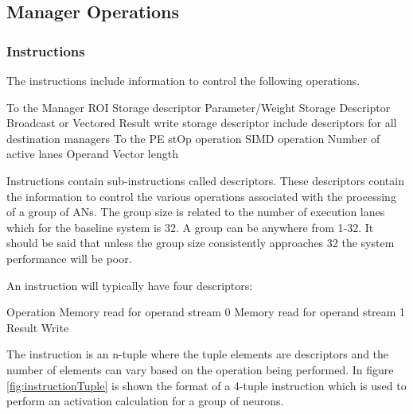 \documentclass[journal]{IEEEtran}
\begin{document}
\subsection{Manager Operations}
\label{sec:Manager Operations}

\subsubsection{Instructions}
\label{ssec:Instructions}
The instructions include information to control the following operations.

\begin{outline}
        \1 To the Manager
            \2 ROI Storage descriptor
            \2 Parameter/Weight Storage Descriptor
                \3 Broadcast or Vectored
            \2 Result write storage descriptor
                \3 include descriptors for all destination managers
        \1 To the PE
            \2 stOp operation
            \2 SIMD operation
            \2 Number of active lanes
            \2 Operand Vector length
\end{outline}


Instructions contain sub-instructions called descriptors. 
These descriptors contain the information to control the various operations associated with the processing of a group of ANs.
The group size is related to the number of execution lanes which for the baseline system is 32. A group can be anywhere from 1-32. It should be said that unless the group size consistently approaches 32 the system performance will be poor.

An instruction will typically have four descriptors:

\begin{outline}
\renewcommand{\outlinei}{enumerate}
    \1 Operation
    \1 Memory read for operand stream 0
    \1 Memory read for operand stream 1
    \1 Result Write
\end{outline}

The instruction is an n-tuple where the tuple elements are descriptors and the number of elements can vary based on the operation being performed. In figure \ref{fig:instructionTuple} is shown the format of a 4-tuple instruction which is used to perform an activation calculation for a group of neurons.
\end{document}
